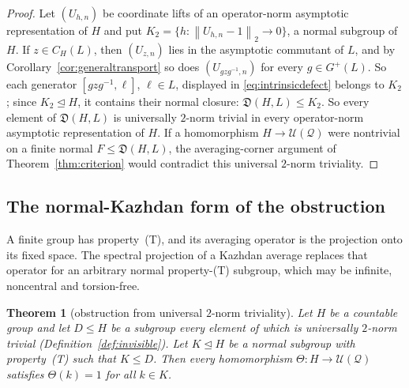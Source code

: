 \documentclass[11pt]{amsart}
\newcommand{\leanverified}[2]{\ignorespaces}
\newtheorem{theorem}{Theorem}[section]
\theoremstyle{definition}
\theoremstyle{remark}
\theoremstyle{plain}
\newcommand{\U}{\mathcal U}
\newcommand{\hsnorm}[1]{\left\lVert #1\right\rVert_{2}}
\begin{document}
\begin{proof}
Let $(U_{h,n})$ be coordinate lifts of an operator-norm asymptotic
representation of $H$ and put
$K_2=\{h:\hsnorm{U_{h,n}-1}\to0\}$, a normal subgroup of $H$.
If $z\in C_H(L)$, then $(U_{z,n})$ lies in the asymptotic commutant of
$L$, and by Corollary~\ref{cor:generaltransport} so does
$(U_{gzg^{-1},n})$ for every $g\in G^{+}(L)$.  So each
generator $[gzg^{-1},\ell]$, $\ell\in L$, displayed in
\eqref{eq:intrinsicdefect} belongs to $K_2$; since
$K_2\trianglelefteq H$, it contains their normal closure:
$\mathfrak D(H,L)\le K_2$.  So every element of $\mathfrak D(H,L)$ is
universally $2$-norm trivial in every operator-norm asymptotic
representation of $H$.  If a homomorphism $H\to\U(\mathcal Q)$ were
nontrivial on a finite normal $F\le\mathfrak D(H,L)$, the
averaging-corner argument of Theorem~\ref{thm:criterion} would
contradict this universal $2$-norm triviality.
\end{proof}

\subsection{The normal-Kazhdan form of the obstruction}

A finite group has property~\textup{(T)}, and its averaging operator is
the projection onto its fixed space.  The spectral projection of a
Kazhdan average replaces that operator for an arbitrary normal
property-\textup{(T)} subgroup, which may be infinite, noncentral and
torsion-free.

\begin{theorem}[obstruction from universal $2$-norm triviality]\label{thm:abstract-nk}
Let $H$ be a countable group and let $D\le H$ be a subgroup every
element of which is universally $2$-norm trivial
(Definition~\ref{def:invisible}).  Let $K\trianglelefteq H$ be a normal subgroup with
property~\textup{(T)} such that $K\le D$.  Then every homomorphism $\Theta\colon H\to\U(\mathcal Q)$ satisfies
$\Theta(k)=1$ for all $k\in K$.
\leanverified{Sofic/ManuscriptExactWrappers}{GroupApproximation.ManuscriptExactWrappers.manuscriptAbstractNormalKazhdanObstruction}
\end{theorem}
\end{document}
